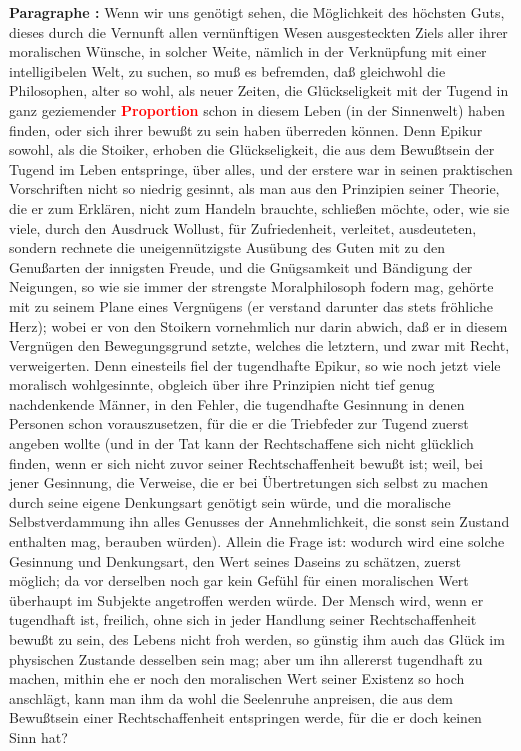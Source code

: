 \documentclass[a4paper,12pt,twoside]{book}
\newcommand{\match}[1]{\textcolor{red}{\textbf{#1}}}
\begin{document}
	\textbf{Paragraphe : }Wenn wir uns genötigt sehen, die Möglichkeit des höchsten Guts, dieses durch die Vernunft allen vernünftigen Wesen ausgesteckten Ziels aller ihrer moralischen Wünsche, in solcher Weite, nämlich in der Verknüpfung mit einer intelligibelen Welt, zu suchen, so muß es befremden, daß gleichwohl die Philosophen, alter so wohl, als neuer Zeiten, die Glückseligkeit mit der Tugend in ganz geziemender \match{Proportion} schon in diesem Leben (in der Sinnenwelt) haben finden, oder sich ihrer bewußt zu sein haben überreden können. Denn Epikur sowohl, als die Stoiker, erhoben die Glückseligkeit, die aus dem Bewußtsein der Tugend im Leben entspringe, über alles, und der erstere war in seinen praktischen Vorschriften nicht so niedrig gesinnt, als man aus den Prinzipien seiner Theorie, die er zum Erklären, nicht zum Handeln brauchte, schließen möchte, oder, wie sie viele, durch den Ausdruck Wollust, für Zufriedenheit, verleitet, ausdeuteten, sondern rechnete die uneigennützigste Ausübung des Guten mit zu den Genußarten der innigsten Freude, und die Gnügsamkeit und Bändigung der Neigungen, so wie sie immer der strengste Moralphilosoph fodern mag, gehörte mit zu seinem Plane eines Vergnügens (er verstand  darunter das stets fröhliche Herz); wobei er von den Stoikern vornehmlich nur darin abwich, daß er in diesem Vergnügen den Bewegungsgrund setzte, welches die letztern, und zwar mit Recht, verweigerten. Denn einesteils fiel der tugendhafte Epikur, so wie noch jetzt viele moralisch wohlgesinnte, obgleich über ihre Prinzipien nicht tief genug nachdenkende Männer, in den Fehler, die tugendhafte Gesinnung in denen Personen schon vorauszusetzen, für die er die Triebfeder zur Tugend zuerst angeben wollte (und in der Tat kann der Rechtschaffene sich nicht glücklich finden, wenn er sich nicht zuvor seiner Rechtschaffenheit bewußt ist; weil, bei jener Gesinnung, die Verweise, die er bei Übertretungen sich selbst zu machen durch seine eigene Denkungsart genötigt sein würde, und die moralische Selbstverdammung ihn alles Genusses der Annehmlichkeit, die sonst sein Zustand enthalten mag, berauben würden). Allein die Frage ist: wodurch wird eine solche Gesinnung und Denkungsart, den Wert seines Daseins zu schätzen, zuerst möglich; da vor derselben noch gar kein Gefühl für einen moralischen Wert überhaupt im Subjekte angetroffen werden würde. Der Mensch wird, wenn er tugendhaft ist, freilich, ohne sich in jeder Handlung seiner Rechtschaffenheit bewußt zu sein, des Lebens nicht froh werden, so günstig ihm auch das Glück im physischen Zustande desselben sein mag; aber um ihn allererst tugendhaft zu machen, mithin ehe er noch den moralischen Wert seiner Existenz so hoch anschlägt, kann man ihm da wohl die Seelenruhe anpreisen, die aus dem Bewußtsein einer Rechtschaffenheit entspringen werde, für die er doch keinen Sinn hat? 
	
\end{document}
